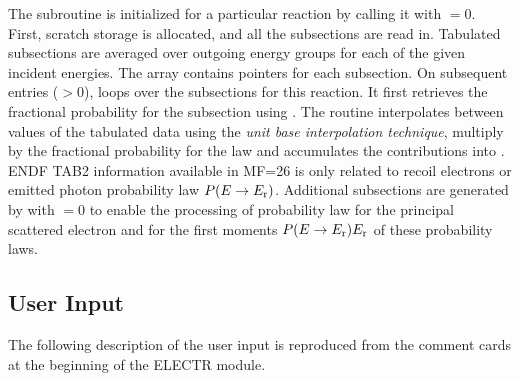 The subroutine  is initialized for a particular reaction by
calling it with  $=0$. First, scratch storage is allocated, and
all the subsections are read in. Tabulated subsections are averaged over
outgoing energy groups for each of the given incident energies.  The array
 contains pointers for each subsection. On subsequent entries
($>$0),  loops over the subsections for this reaction.
It first retrieves the fractional probability for the subsection using
. The routine interpolates between
values of the tabulated data using the {\sl unit base interpolation
technique}, multiply by the fractional probability for the law and
accumulates the contributions into . ENDF TAB2 information
available in MF=26 is only related to recoil electrons or emitted photon
probability law $P(E\rightarrow E_{\rm r})$. Additional subsections are
generated by  with  $=0$ to enable the processing
of probability law for the principal scattered electron and for the first
moments $P(E\rightarrow E_{\rm r})E_{\rm r}$ of these probability laws.

\subsection{User Input}
\label{ssELECTR_UserInp}

The following description of the user input is reproduced from
the comment cards at the beginning of the ELECTR module.

